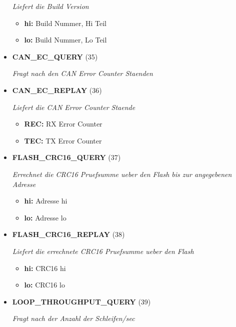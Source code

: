 \begin{itemize}
\textit{Liefert die Build Version}

\small
\begin{itemize}
		
\item \textbf{hi:} Build Nummer, Hi Teil
\item \textbf{lo:} Build Nummer, Lo Teil
\end{itemize}
\normalsize
	
\item \textbf{CAN\_EC\_QUERY} (35)

\textit{Fragt nach den CAN Error Counter Staenden}

\item \textbf{CAN\_EC\_REPLAY} (36)

\textit{Liefert die CAN Error Counter Staende}

\small
\begin{itemize}
		
\item \textbf{REC:} RX Error Counter
\item \textbf{TEC:} TX Error Counter
\end{itemize}
\normalsize
	
\item \textbf{FLASH\_CRC16\_QUERY} (37)

\textit{Errechnet die CRC16 Pruefsumme ueber den Flash bis zur angegebenen Adresse}

\small
\begin{itemize}
		
\item \textbf{hi:} Adresse hi
\item \textbf{lo:} Adresse lo
\end{itemize}
\normalsize
	
\item \textbf{FLASH\_CRC16\_REPLAY} (38)

\textit{Liefert die errechnete CRC16 Pruefsumme ueber den Flash}

\small
\begin{itemize}
		
\item \textbf{hi:} CRC16 hi
\item \textbf{lo:} CRC16 lo
\end{itemize}
\normalsize
	
\item \textbf{LOOP\_THROUGHPUT\_QUERY} (39)

\textit{Fragt nach der Anzahl der Schleifen/sec}


\end{itemize}
